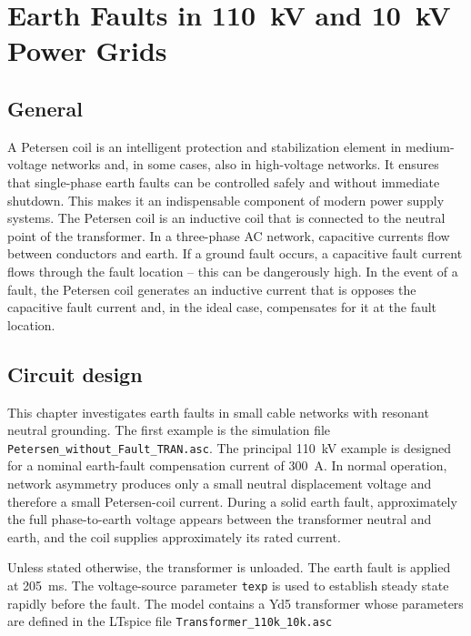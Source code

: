 \chapter{Earth Faults in \SI{110}{\kilo\volt} and \SI{10}{\kilo\volt} Power Grids}
\label{chap:earth-faults}

\section{General}
\label{sec:earth-fault-general}

A Petersen coil is an intelligent protection and stabilization element in medium-voltage networks and, in some cases, also in high-voltage networks. It ensures that single-phase earth faults can be controlled safely and without immediate shutdown. This makes it an indispensable component of modern power supply systems.
The Petersen coil is an inductive coil that is connected to the neutral point of the transformer. In a three-phase AC network, capacitive currents flow between conductors and earth. If a ground fault occurs, a capacitive fault current flows through the fault location – this can be dangerously high.
In the event of a fault, the Petersen coil generates an inductive current that is opposes the capacitive fault current and, in the ideal case, compensates for it at the fault location.

\section{Circuit design}

This chapter investigates earth faults in small cable networks with resonant neutral grounding. The first example is the simulation file \texttt{Petersen\_without\_Fault\_TRAN.asc}. The principal \SI{110}{\kilo\volt} example is designed for
a nominal earth-fault compensation current of \SI{300}{\ampere}. In normal
operation, network asymmetry produces only a small neutral displacement
voltage and therefore a small Petersen-coil current. During a solid earth
fault, approximately the full phase-to-earth voltage appears between the
transformer neutral and earth, and the coil supplies approximately its rated
current.

Unless stated otherwise, the transformer is unloaded. The earth fault is
applied at \SI{205}{\milli\second}. The voltage-source parameter
\texttt{texp} is used to establish steady state rapidly before the fault. The
model contains a Yd5 transformer whose parameters are defined in the LTspice file \texttt{Transformer\_110k\_10k.asc}


